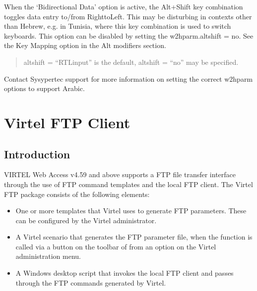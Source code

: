 \documentclass[letterpaper,10pt,english]{sphinxmanual}
\begin{document}
\sphinxAtStartPar
When the ‘Bidirectional Data’ option is active, the Alt+Shift key combination toggles data entry to/from Right\sphinxhyphen{}to\sphinxhyphen{}Left. This may be disturbing in contexts other than Hebrew, e.g. in Tunisia, where this key combination is used to switch keyboards. This option can be disabled by setting the w2hparm.altshift = no.  See the Key Mapping option in the Alt modifiers section.
\begin{quote}

\sphinxAtStartPar
altshift = “RTLinput” is the default, altshift = “no” may be specified.
\end{quote}

\sphinxAtStartPar
Contact Sysypertec support for more information on setting the correct w2hparm options to support Arabic.

\ignorespaces 

\chapter{Virtel FTP Client}
\label{\detokenize{Customization:virtel-ftp-client}}\label{\detokenize{Customization:index-126}}

\section{Introduction}
\label{\detokenize{Customization:id2}}
\sphinxAtStartPar
VIRTEL Web Access v4.59 and above supports a FTP file transfer interface through the use of FTP command templates and the local FTP client. The Virtel FTP package consists of the following elements:
\begin{itemize}
\item {} 
\sphinxAtStartPar
One or more templates that Virtel uses to generate FTP parameters. These can be configured by the Virtel administrator.

\item {} 
\sphinxAtStartPar
A Virtel scenario that generates the FTP parameter file, when the function is called via a button on the toolbar of from an option on the Virtel administration menu.

\item {} 
\sphinxAtStartPar
A Windows desktop script that invokes the local FTP client and passes through the FTP commands generated by Virtel.

\end{itemize}
\end{document}
